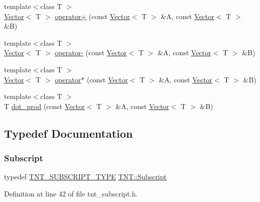 \begin{DoxyCompactItemize}
\item 
{\footnotesize template$<$class T $>$ }\\\hyperlink{classTNT_1_1Vector}{Vector}$<$ T $>$ \hyperlink{namespaceTNT_ab92825996c7ec6991d06eca11863e0c0}{operator+} (const \hyperlink{classTNT_1_1Vector}{Vector}$<$ T $>$ \&A, const \hyperlink{classTNT_1_1Vector}{Vector}$<$ T $>$ \&B)
\item 
{\footnotesize template$<$class T $>$ }\\\hyperlink{classTNT_1_1Vector}{Vector}$<$ T $>$ \hyperlink{namespaceTNT_a1be3c1e84293029bae011fb0d5c8f82a}{operator-\/} (const \hyperlink{classTNT_1_1Vector}{Vector}$<$ T $>$ \&A, const \hyperlink{classTNT_1_1Vector}{Vector}$<$ T $>$ \&B)
\item 
{\footnotesize template$<$class T $>$ }\\\hyperlink{classTNT_1_1Vector}{Vector}$<$ T $>$ \hyperlink{namespaceTNT_a6a759501941fd46aa222319403fedfc4}{operator$\ast$} (const \hyperlink{classTNT_1_1Vector}{Vector}$<$ T $>$ \&A, const \hyperlink{classTNT_1_1Vector}{Vector}$<$ T $>$ \&B)
\item 
{\footnotesize template$<$class T $>$ }\\T \hyperlink{namespaceTNT_a3a98dd3afb32d1c69826da446eb2e995}{dot\+\_\+prod} (const \hyperlink{classTNT_1_1Vector}{Vector}$<$ T $>$ \&A, const \hyperlink{classTNT_1_1Vector}{Vector}$<$ T $>$ \&B)
\end{DoxyCompactItemize}


\subsection{Typedef Documentation}
\mbox{\label{namespaceTNT_af22e3f1460e145c04ce4e7d701e4c1c1}} 
\subsubsection{\texorpdfstring{Subscript}{Subscript}}
{\footnotesize\ttfamily typedef \hyperlink{tnt__subscript_8h_ae204fca2c823f77ee865da86d3bf53d0}{T\+N\+T\+\_\+\+S\+U\+B\+S\+C\+R\+I\+P\+T\+\_\+\+T\+Y\+PE} \hyperlink{namespaceTNT_af22e3f1460e145c04ce4e7d701e4c1c1}{T\+N\+T\+::\+Subscript}}



Definition at line 42 of file tnt\+\_\+subscript.\+h.



